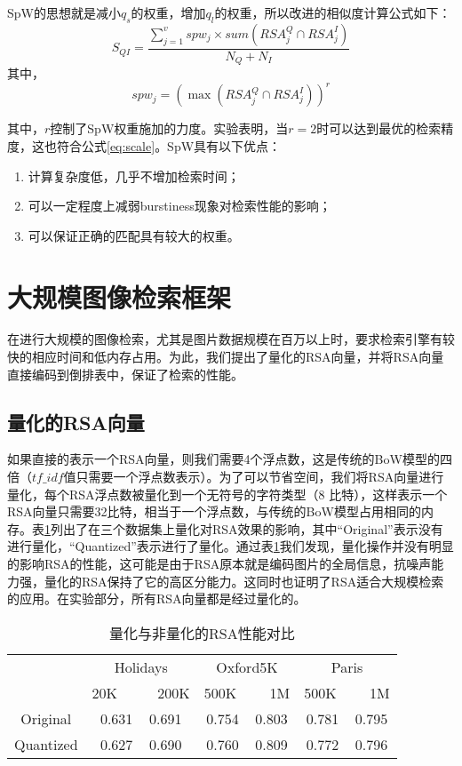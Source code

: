 SpW的思想就是减小$q_s$的权重，增加$q_l$的权重，所以改进的相似度计算公式如下：
\begin{equation} \label{eq:sim2}
S_{QI} = \frac{\sum_{j=1}^vspw_j \times sum(RSA_j^Q \cap RSA_j^I)}{N_Q + N_I}
\end{equation}
其中，
\begin{equation} \label{eq:sim3}
spw_j = (\max(RSA_j^Q \cap RSA_j^I))^r
\end{equation}

其中，$r$控制了SpW权重施加的力度。实验表明，当$r=2$时可以达到最优的检索精度，这也符合公式\ref{eq:scale}。SpW具有以下优点：
\begin{enumerate}
	\item 计算复杂度低，几乎不增加检索时间；
	\item 可以一定程度上减弱burstiness现象对检索性能的影响；
	\item 可以保证正确的匹配具有较大的权重。
\end{enumerate}

\section{大规模图像检索框架}
在进行大规模的图像检索，尤其是图片数据规模在百万以上时，要求检索引擎有较快的相应时间和低内存占用。为此，我们提出了量化的RSA向量，并将RSA向量直接编码到倒排表中，保证了检索的性能。

\subsection{量化的RSA向量}
如果直接的表示一个RSA向量，则我们需要4个浮点数，这是传统的BoW模型的四倍（$tf\_idf$值只需要一个浮点数表示）。为了可以节省空间，我们将RSA向量进行量化，每个RSA浮点数被量化到一个无符号的字符类型（8 比特），这样表示一个RSA向量只需要32比特，相当于一个浮点数，与传统的BoW模型占用相同的内存。表\ref{tab:quantization}列出了在三个数据集上量化对RSA效果的影响，其中“Original”表示没有进行量化，“Quantized”表示进行了量化。通过表\ref{tab:quantization}我们发现，量化操作并没有明显的影响RSA的性能，这可能是由于RSA原本就是编码图片的全局信息，抗噪声能力强，量化的RSA保持了它的高区分能力。这同时也证明了RSA适合大规模检索的应用。在实验部分，所有RSA向量都是经过量化的。
\begin{table}
	\begin{center}
		\begin{tabular}{|c|c|c|c|}
			\hline
			& Holidays       & Oxford5K         & Paris\\
			& 20K~~~~~ 200K  & 500K~~~~ 1M    & 500K~~~~ 1M\\
			\hline\hline
			Original    & 0.631 ~ 0.691  & 0.754 ~ 0.803  & 0.781 ~ 0.795\\
			Quantized	& 0.627 ~ 0.690  & 0.760 ~ 0.809  & 0.772 ~ 0.796\\
			\hline
		\end{tabular}
	\end{center}
	\caption{量化与非量化的RSA性能对比} 
	\label{tab:quantization}
\end{table}

